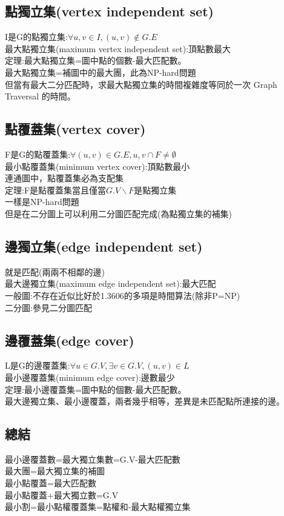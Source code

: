 \documentclass{article}
\begin{document}
\subsection{點獨立集(vertex independent set)}
I是G的點獨立集:$\forall u,v\in I,(u, v)\notin G.E$\\
最大點獨立集(maximum vertex independent set):頂點數最大\\
定理:最大點獨立集=圖中點的個數-最大匹配數。\\
最大點獨立集=補圖中的最大團，此為NP-hard問題\\
但當有最大二分匹配時，求最大點獨立集的時間複雜度等同於一次 Graph Traversal 的時間。\\
\subsection{點覆蓋集(vertex cover)}
F是G的點覆蓋集:$\forall (u,v)\in G.E,{u,v}\cap F\neq \emptyset $\\
最小點覆蓋集(minimum vertex cover):頂點數最小\\
連通圖中，點覆蓋集必為支配集\\
定理:F是點覆蓋集當且僅當$G.V\backslash F$是點獨立集\\
一樣是NP-hard問題\\
但是在二分圖上可以利用二分圖匹配完成(為點獨立集的補集)\\
\subsection{邊獨立集(edge independent set)}
就是匹配(兩兩不相鄰的邊)\\
最大邊獨立集(maximum edge independent set):最大匹配\\
一般圖:不存在近似比好於1.3606的多項是時間算法(除非P=NP)\\
二分圖:參見二分圖匹配\\
\subsection{邊覆蓋集(edge cover)}
L是G的邊覆蓋集:$\forall u\in G.V,\exists v\in G.V,(u,v)\in L$\\
最小邊覆蓋集(minimum edge cover):邊數最少\\
定理:最小邊覆蓋集=圖中點的個數-最大匹配數。\\
最大邊獨立集、最小邊覆蓋，兩者幾乎相等，差異是未匹配點所連接的邊。\\
\subsection{總結}
最小邊覆蓋數=最大獨立集數=G.V-最大匹配數\\
最大團=最大獨立集的補圖\\
最小點覆蓋=最大匹配數\\
最小點覆蓋+最大獨立數=G.V\\
最小割=最小點權覆蓋集=點權和-最大點權獨立集\\
\end{document}
